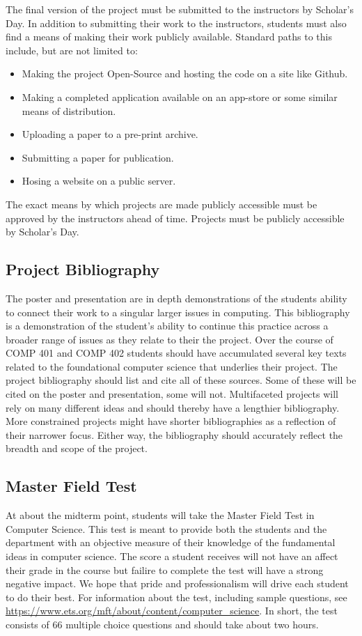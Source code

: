 \documentclass[]{article}
\begin{document}
The final version of the project must be submitted to the instructors by Scholar's Day. In addition to submitting their work to the instructors, students must also find a means of making their work publicly available. Standard paths to this include, but are not limited to:
\begin{itemize}
\item Making the project Open-Source and hosting the code on a site like Github.
\item Making a completed application available on an app-store or some similar means of distribution.
\item Uploading a paper to a pre-print archive.
\item Submitting a paper for publication.
\item Hosing a website on a public server.
\end{itemize}
The exact means by which projects are made publicly accessible must be approved by the instructors ahead of time. Projects must be publicly accessible by Scholar's Day.

\subsection{Project Bibliography}

The poster and presentation are in depth demonstrations of the students ability to connect their work to a singular larger issues in computing. This bibliography is a demonstration of the student's ability to continue this practice across a broader range of issues as they relate to their the project. Over the course of COMP 401 and COMP 402 students should have accumulated several key texts related to the foundational computer science that underlies their project. The project bibliography should list and cite all of these sources. Some of these will be cited on the poster and presentation, some will not.  Multifaceted projects will rely on many different ideas and should thereby have a lengthier bibliography. More constrained projects might have shorter bibliographies as a reflection of their narrower focus. Either way, the bibliography should accurately reflect the breadth and scope of the project.

\subsection{Master Field Test}

At about the midterm point, students will take the Master Field Test in Computer Science. This test is meant to provide both the students and the department with an objective measure of their knowledge of the fundamental ideas in computer science. The score a student receives will not have an affect their grade in the course but failire to complete the test will have a strong negative impact. We hope that pride and professionalism will drive each student to do their best. For information about the test, including sample questions, see \url{https://www.ets.org/mft/about/content/computer_science}. In short, the test consists of 66 multiple choice questions and should take about two hours.
\end{document}
